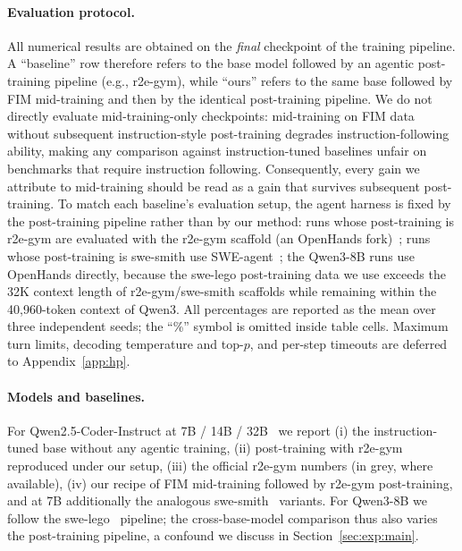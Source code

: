 \paragraph{Evaluation protocol.}
All numerical results are obtained on the \emph{final} checkpoint of the
training pipeline. A ``baseline'' row therefore refers to the base model
followed by an agentic post-training pipeline (e.g., r2e-gym), while ``ours''
refers to the same base followed by FIM mid-training and then by the
identical post-training pipeline. We do not directly evaluate
mid-training-only checkpoints: mid-training on FIM data without subsequent
instruction-style post-training degrades instruction-following ability,
making any comparison against instruction-tuned baselines unfair on
benchmarks that require instruction following. Consequently, every gain we
attribute to mid-training should be read as a gain that survives subsequent
post-training. To match each baseline's evaluation setup, the agent
harness is fixed by the post-training pipeline rather than by our method:
runs whose post-training is r2e-gym are evaluated with the r2e-gym scaffold
(an OpenHands fork)~\citep{TODO_openhands, TODO_r2egym}; runs whose
post-training is swe-smith use SWE-agent~\citep{TODO_sweagent}; the Qwen3-8B
runs use OpenHands directly, because the swe-lego post-training data we use
exceeds the 32K context length of r2e-gym/swe-smith scaffolds while
remaining within the 40{,}960-token context of Qwen3.
All percentages are reported as the mean over three independent seeds; the
``\%'' symbol is omitted inside table cells. Maximum turn limits, decoding
temperature and top-$p$, and per-step timeouts are deferred to
Appendix~\ref{app:hp}.

\paragraph{Models and baselines.}
For Qwen2.5-Coder-Instruct at 7B / 14B / 32B~\citep{TODO_qwen_coder} we
report (i) the instruction-tuned base without any agentic training,
(ii) post-training with r2e-gym reproduced under our setup, (iii) the
official r2e-gym numbers (in grey, where available), (iv) our recipe of
FIM mid-training followed by r2e-gym post-training, and at 7B additionally
the analogous swe-smith~\citep{TODO_swesmith} variants. For Qwen3-8B we
follow the swe-lego~\citep{TODO_swelego} pipeline; the cross-base-model
comparison thus also varies the post-training pipeline, a confound we
discuss in Section~\ref{sec:exp:main}.



